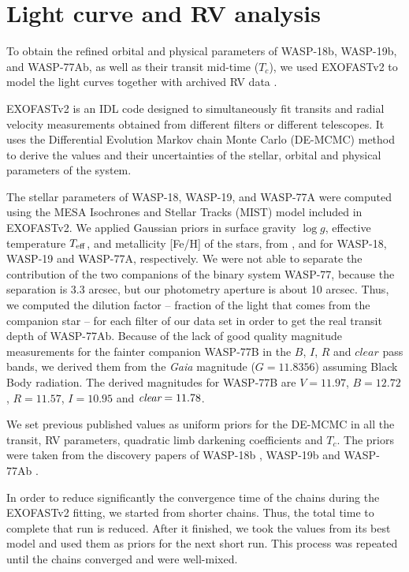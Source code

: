 \section{Light curve and RV analysis}\label{lc}

To obtain the refined orbital and physical parameters of WASP-18b, WASP-19b, and WASP-77Ab, as well as their transit mid-time ($T_{c}$), we used EXOFASTv2 \citep{Eastman2013,Eastman2017} to model the light curves together with archived RV data \cite{Hellier2009, Hebb2010, Maxted2013}.

EXOFASTv2 is an IDL code designed to simultaneously fit transits and radial velocity measurements obtained from different filters or different telescopes. It uses the Differential Evolution Markov chain Monte Carlo (DE-MCMC) method to derive the values and their uncertainties of the stellar, orbital and physical parameters of the system. 

The stellar parameters of WASP-18, WASP-19, and WASP-77A were computed using the MESA Isochrones and Stellar Tracks (MIST) model \citep{Dotter2016} included in EXOFASTv2. We applied Gaussian priors in surface gravity $\log{g}$, effective temperature $T_{\rm eff}$, and metallicity [Fe/H] of the stars, from \cite{Hellier2009},\cite{Hebb2010} and \cite{Maxted2013} for WASP-18, WASP-19 and WASP-77A, respectively. 
We were not able to separate the contribution of the two companions of the binary system WASP-77, because the separation is 3.3 arcsec, but our photometry aperture is about 10 arcsec. Thus, we computed the dilution factor -- fraction of the light that comes from the companion star -- for each filter of our data set in order to get the real transit depth of WASP-77Ab. Because of the lack of good quality magnitude measurements for the fainter companion WASP-77B in the $B$, $I$, $R$ and $clear$ pass bands, we derived them from the \emph{Gaia} magnitude ($G=11.8356$) assuming Black Body radiation. The derived magnitudes for WASP-77B are $V=11.97$, $B=12.72$, $R=11.57$, $I=10.95$ and $\emph{clear}=11.78$.

We set previous published values as uniform priors for the DE-MCMC in all the transit, RV parameters, quadratic limb darkening coefficients and $T_{c}$. The priors were taken from the discovery papers of WASP-18b \citep{Hellier2009}, WASP-19b \citep{Hebb2010} and WASP-77Ab \citep{Maxted2013}. 

In order to reduce significantly the convergence time of the chains during the EXOFASTv2 fitting, we started from shorter chains. Thus, the total time to complete that run is reduced. After it finished, we took the values from its best model and used them as priors for the next short run. This process was repeated until the chains converged and were well-mixed.

